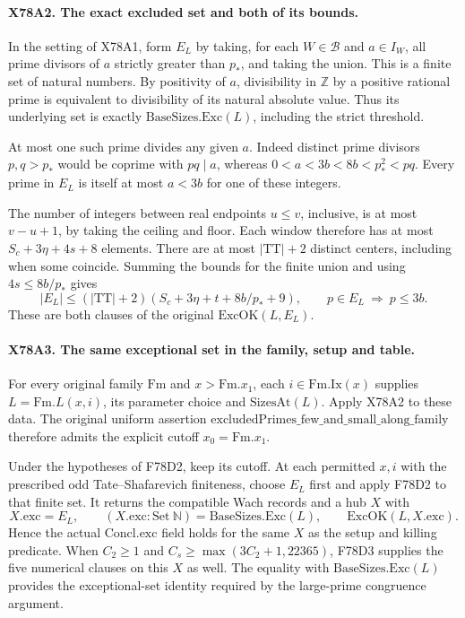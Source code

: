 \paragraph{X78A2. The exact excluded set and both of its bounds.}
In the setting of X78A1, form $E_L$ by taking, for each
$W\in\mathcal B$ and $a\in I_W$, all prime divisors of $a$
strictly greater than $p_*$, and taking the union. This is a finite
set of natural numbers. By positivity of $a$, divisibility in
$\mathbb Z$ by a positive rational prime is equivalent to divisibility
of its natural absolute value. Thus its underlying set is exactly
$\mathrm{BaseSizes.Exc}(L)$, including the strict threshold.

At most one such prime divides any given $a$. Indeed distinct
prime divisors $p,q>p_*$ would be coprime with $pq\mid a$, whereas
$0<a<3b<8b<p_*^2<pq$. Every prime in $E_L$ is itself at most
$a<3b$ for one of these integers.

The number of integers between real endpoints $u\le v$, inclusive,
is at most $v-u+1$, by taking the ceiling and floor. Each window
therefore has at most $S_c+3\eta+4s+8$ elements. There are at most
$|\mathrm{TT}|+2$ distinct centers, including when some coincide.
Summing the bounds for the finite union and using $4s\le8b/p_*$
gives
\[
 |E_L|\le (|\mathrm{TT}|+2)
       (S_c+3\eta+t+8b/p_*+9),\qquad
 p\in E_L\ \Longrightarrow\ p\le3b .
\]
These are both clauses of the original $\mathrm{ExcOK}(L,E_L)$.

\paragraph{X78A3. The same exceptional set in the family, setup and table.}
For every original family $\mathrm{Fm}$ and $x>\mathrm{Fm}.x_1$,
each $i\in\mathrm{Fm}.\mathrm{Ix}(x)$ supplies $L=\mathrm{Fm}.L(x,i)$,
its parameter choice and $\mathrm{SizesAt}(L)$. Apply X78A2 to
these data. The original uniform assertion
$\mathrm{excludedPrimes\_few\_and\_small\_along\_family}$
therefore admits the explicit cutoff $x_0=\mathrm{Fm}.x_1$.

Under the hypotheses of F78D2, keep its cutoff. At each permitted
$x,i$ with the prescribed odd Tate--Shafarevich finiteness, choose
$E_L$ first and apply F78D2 to that finite set. It returns the
compatible Wach records and a hub $X$ with
\[
 X.\mathrm{exc}=E_L,\qquad
 (X.\mathrm{exc}:\mathrm{Set}\ \mathbb N)=\mathrm{BaseSizes.Exc}(L),
 \qquad \mathrm{ExcOK}(L,X.\mathrm{exc}).
\]
Hence the actual $\mathrm{Concl.exc}$ field holds for the same $X$
as the setup and killing predicate. When $C_2\ge1$ and
$C_s\ge\max(3C_2+1,22365)$, F78D3 supplies the five numerical
clauses on this $X$ as well. The equality with
$\mathrm{BaseSizes.Exc}(L)$ provides the exceptional-set identity
required by the large-prime congruence argument.
